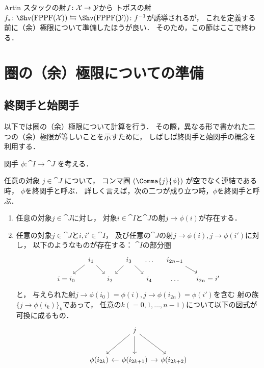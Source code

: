     Artin スタックの射$f \colon \mathcal{X} \to \mathcal{Y}$から
    トポスの射$f_* \colon \Shv(\FPPF(\stX)) \leftrightarrows \Shv(\FPPF(\stY)) \colon f^{-1}$が誘導されるが，
    これを定義する前に（余）極限について準備したほうが良い．
    そのため，この節はここで終わる．

\section{圏の（余）極限についての準備}

    \subsection{終関手と始関手}
    以下では圏の（余）極限について計算を行う．
    その際，異なる形で書かれた二つの（余）極限が等しいことを示すために，
    しばしば終関手と始関手の概念を利用する．

    \begin{Def}[終関手]
        関手 $\phi \colon \cat{I} \to \cat{J}$ を考える．

        任意の対象 $j \in \cat{J}$ について，
        コンマ圏 $(\Comma{j}{\phi})$ が空でなく連結である時，
        $\phi$を終関手と呼ぶ．
        詳しく言えば，次の二つが成り立つ時，$\phi$を終関手と呼ぶ．
        \begin{enumerate}[label=(\alph*)]
            \item
                任意の対象$j \in \cat{J}$に対し，
                対象$i \in \cat{I}$と$\cat{J}$の射$j \to \phi(i)$が存在する．

            \item
                任意の対象$j \in \cat{J}$と$i, i' \in \cat{I}$，
                及び任意の$\cat{J}$の射$j \to \phi(i), j \to \phi(i')$に対し，
                以下のようなものが存在する：
                $\cat{I}$の部分圏
                \[
                \begin{tikzcd}[sep=10pt]
                    & i_1 \ar[ld]\ar[rd]&& i_3 \ar[ld]\ar[rd] & \dots & i_{2n-1} \ar[rd]\\
                    i=i_0 && i_2 && i_4 & \dots & i_{2n}=i'
                \end{tikzcd}
                \]
                と，
                与えられた射$j \to \phi(i_0)=\phi(i), j \to \phi(i_{2n})=\phi(i')$を含む
                射の族$\{ j \to \phi(i_k) \}_{k}$であって，
                任意の$k(=0,1,\dots,n-1)$について以下の図式が可換に成るもの．
                \[
                    \begin{tikzcd}[column sep=10pt, row sep=25pt]
                    & j \ar[ld]\ar[rd]\ar[d]& \\
                    \phi(i_{2k}) & \phi(i_{2k+1}) \ar[l]\ar[r]& \phi(i_{2k+2})
                \end{tikzcd}
                \]
        \end{enumerate}
    \end{Def}

